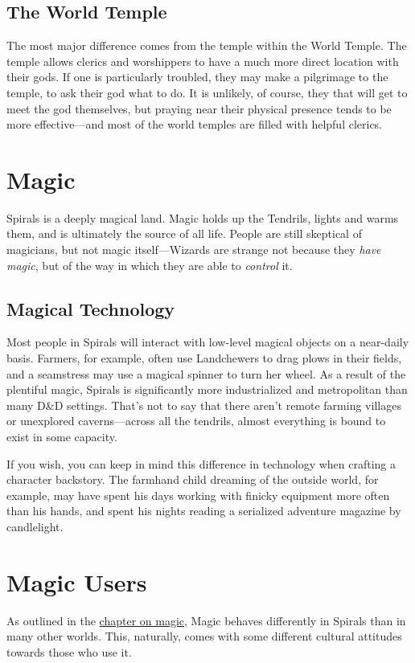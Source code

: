\begin{multicols}{2}
\subsection{The World Temple}
The most major difference comes from the temple within the World Temple.
The temple allows clerics and worshippers to have a much more direct location with their gods.
If one is particularly troubled, they may make a pilgrimage to the temple, to ask their god what to do.
It is unlikely, of course, they that will get to meet the god themselves, but praying near their physical presence tends to be more effective---and most of the world temples are filled with helpful clerics.

\section{Magic}
Spirals is a deeply magical land.
Magic holds up the Tendrils, lights and warms them, and is ultimately the source of all life.
People are still skeptical of magicians, but not magic itself---Wizards are strange not because they \textit{have magic}, but of the way in which they are able to \textit{control} it.

\subsection{Magical Technology}
Most people in Spirals will interact with low-level magical objects on a near-daily basis.
Farmers, for example, often use Landchewers to drag plows in their fields, and a seamstress may use a magical spinner to turn her wheel.
As a result of the plentiful magic, Spirals is significantly more industrialized and metropolitan than many D\&D settings.
That's not to say that there aren't remote farming villages or unexplored caverns---across all the tendrils, almost everything is bound to exist in some capacity.

If you wish, you can keep in mind this difference in technology when crafting a character backstory.
The farmhand child dreaming of the outside world, for example, may have spent his days working with finicky equipment more often than his hands, and spent his nights reading a serialized adventure magazine by candlelight.
\section{Magic Users}
As outlined in the \hyperref[chapter:magic]{chapter on magic}, Magic behaves differently in Spirals than in many other worlds.
This, naturally, comes with some different cultural attitudes towards those who use it.


\end{multicols}
